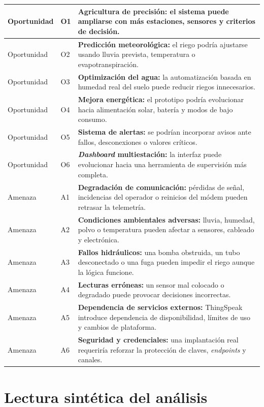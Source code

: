 \begin{longtable}{|
>{\raggedright\arraybackslash}p{}|
>{\raggedright\arraybackslash}p{}|
>{\raggedright\arraybackslash}p{}|}
Oportunidad & O1 & \textbf{Agricultura de precisión:} el sistema puede ampliarse con más estaciones, sensores y criterios de decisión. \\
\hline
Oportunidad & O2 & \textbf{Predicción meteorológica:} el riego podría ajustarse usando lluvia prevista, temperatura o evapotranspiración. \\
\hline
Oportunidad & O3 & \textbf{Optimización del agua:} la automatización basada en humedad real del suelo puede reducir riegos innecesarios. \\
\hline
Oportunidad & O4 & \textbf{Mejora energética:} el prototipo podría evolucionar hacia alimentación solar, batería y modos de bajo consumo. \\
\hline
Oportunidad & O5 & \textbf{Sistema de alertas:} se podrían incorporar avisos ante fallos, desconexiones o valores críticos. \\
\hline
Oportunidad & O6 & \textbf{\textit{Dashboard} multiestación:} la interfaz puede evolucionar hacia una herramienta de supervisión más completa. \\
\hline
Amenaza & A1 & \textbf{Degradación de comunicación:} pérdidas de señal, incidencias del operador o reinicios del módem pueden retrasar la telemetría. \\
\hline
Amenaza & A2 & \textbf{Condiciones ambientales adversas:} lluvia, humedad, polvo o temperatura pueden afectar a sensores, cableado y electrónica. \\
\hline
Amenaza & A3 & \textbf{Fallos hidráulicos:} una bomba obstruida, un tubo desconectado o una fuga pueden impedir el riego aunque la lógica funcione. \\
\hline
Amenaza & A4 & \textbf{Lecturas erróneas:} un sensor mal colocado o degradado puede provocar decisiones incorrectas. \\
\hline
Amenaza & A5 & \textbf{Dependencia de servicios externos:} ThingSpeak introduce dependencia de disponibilidad, límites de uso y cambios de plataforma. \\
\hline
Amenaza & A6 & \textbf{Seguridad y credenciales:} una implantación real requeriría reforzar la protección de claves, \textit{endpoints} y canales. \\
\hline

\end{longtable}

\normalsize
\endgroup

\section{Lectura sintética del análisis}

